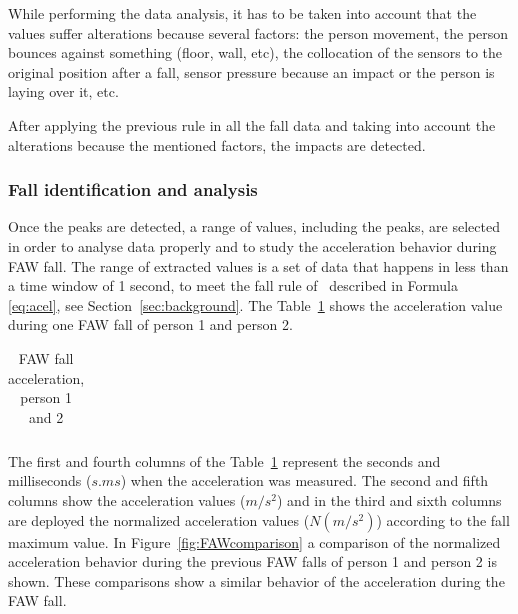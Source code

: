 \documentclass[review]{elsarticle}
\begin{document}
While performing the data analysis, it has to be taken into account that the values suffer 
alterations because several factors: the person movement, the person bounces against something 
(floor, wall, etc), the collocation of the sensors to the original position after a fall, 
sensor pressure because an impact or the person is laying over it, etc.

After applying the previous rule in all the fall data and taking into account the alterations 
because the mentioned factors, the impacts are detected.

\subsubsection*{Fall identification and analysis} Once the peaks are detected, a range of values, 
including the peaks, are selected in order to analyse data properly and to study the acceleration 
behavior during FAW fall. The range of extracted values is a set of data that happens in less 
than a time window of 1 second, to meet the fall rule of~\cite{Luder2009} described in Formula \ref{eq:acel}, see Section~\ref{sec:background}. The Table~\ref{tabla:FAW} shows the 
acceleration value during one FAW fall of person 1 and person 2. 

\begin{table}[!ht]
	\centering
	\begin{tabular}{*{5}{r}}
		
	\end{tabular}
	\caption{FAW fall acceleration, person 1 and 2}%
	\label{tabla:FAW}
\end{table}

The first and fourth columns of the Table~\ref{tabla:FAW} represent the seconds and milliseconds ($s.ms$) when the acceleration was measured. The second and fifth columns show the acceleration values ($m/s^2$) and in the third and sixth columns are deployed the normalized acceleration values 
($N(m/s^2)$) according to the fall maximum value. In Figure~\ref{fig:FAWcomparison} a comparison of the normalized acceleration behavior during the previous FAW falls of person 1 and person 2 is shown. These comparisons show a similar behavior of the acceleration during the FAW fall. \newpage
\end{document}
